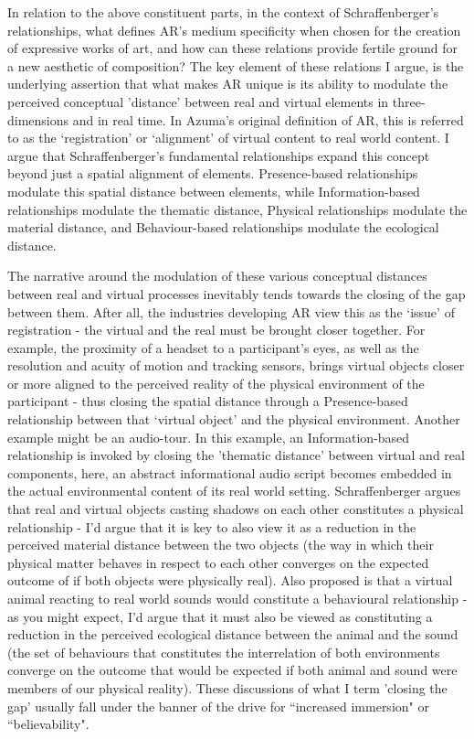 In relation to the above constituent parts, in the context of Schraffenberger's relationships, what defines AR's medium specificity when chosen for the creation of expressive works of art, and how can these relations provide fertile ground for a new aesthetic of composition? The key element of these relations I argue, is the underlying assertion that what makes AR unique is its ability to modulate the perceived conceptual 'distance' between real and virtual elements in three-dimensions and in real time. In Azuma's \citep[]{azuma1997} original definition of AR, this is referred to as the `registration' or `alignment' of virtual content to real world content. I argue that Schraffenberger's fundamental relationships expand this concept beyond just a spatial alignment of elements. Presence-based relationships modulate this spatial distance between elements, while Information-based relationships modulate the thematic distance, Physical relationships modulate the material distance, and Behaviour-based relationships modulate the ecological distance. 

The narrative around the modulation of these various conceptual distances between real and virtual processes inevitably tends towards the closing of the gap between them. After all, the industries developing AR view this as the `issue' of registration - the virtual and the real must be brought closer together. For example, the proximity of a headset to a participant's eyes, as well as the resolution and acuity of motion and tracking sensors, brings virtual objects closer or more aligned to the perceived reality of the physical environment of the participant - thus closing the spatial distance through a Presence-based relationship between that `virtual object' and the physical environment. Another example might be an audio-tour. In this example, an Information-based relationship is invoked by closing the 'thematic distance' between virtual and real components, here, an abstract informational audio script becomes embedded in the actual environmental content of its real world setting. Schraffenberger argues that real and virtual objects casting shadows on each other constitutes a physical relationship - I'd argue that it is key to also view it as a reduction in the perceived material distance between the two objects (the way in which their physical matter behaves in respect to each other converges on the expected outcome of if both objects were physically real). Also proposed is that a virtual animal reacting to real world sounds would constitute a behavioural relationship - as you might expect, I'd argue that it must also be viewed as constituting a reduction in the perceived ecological distance between the animal and the sound (the set of behaviours that constitutes the interrelation of both environments converge on the outcome that would be expected if both animal and sound were members of our physical reality). These discussions of what I term 'closing the gap' usually fall under the banner of the drive for ``increased immersion" or ``believability". 

